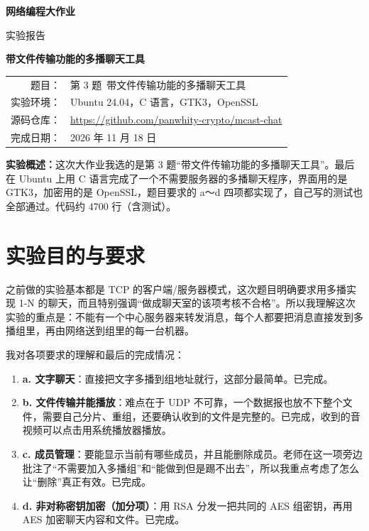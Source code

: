 \documentclass[a4paper,zihao=-4]{ctexart}
\newcommand{\reponame}{{\normalsize\url{https://github.com/panwhity-crypto/mcast-chat}}}
\begin{document}
\begin{titlepage}
  \centering
  \vspace*{3cm}
  {\sffamily\Huge\bfseries 网络编程大作业\par}
  \vspace{0.8cm}
  {\sffamily\LARGE 实验报告\par}
  \vspace{2.5cm}
  {\Large\bfseries 带文件传输功能的多播聊天工具\par}
  \vspace{3cm}
  {\large
  \begin{tabular}{r@{\quad}l}
    \toprule
    题\qquad 目： & 第 3 题\ 带文件传输功能的多播聊天工具 \\
    实验环境： & Ubuntu 24.04，C 语言，GTK3，OpenSSL \\
    源码仓库： & \reponame \\
    完成日期： & 2026 年 11 月 18 日 \\
    \bottomrule
  \end{tabular}\par}
  \vfill
\end{titlepage}

\tableofcontents
\thispagestyle{empty}
\newpage
\setcounter{page}{1}

\noindent\textbf{实验概述：}这次大作业我选的是第 3 题“带文件传输功能的多播聊天工具”。最后在 Ubuntu 上用 C 语言完成了一个不需要服务器的多播聊天程序，界面用的是 GTK3，加密用的是 OpenSSL，题目要求的 a～d 四项都实现了，自己写的测试也全部通过。代码约 4700 行（含测试）。

\section{实验目的与要求}

之前做的实验基本都是 TCP 的客户端/服务器模式，这次题目明确要求用多播实现 1-N 的聊天，而且特别强调“做成聊天室的该项考核不合格”。所以我理解这次实验的重点是：不能有一个中心服务器来转发消息，每个人都要把消息直接发到多播组里，再由网络送到组里的每一台机器。

我对各项要求的理解和最后的完成情况：

\begin{enumerate}
  \item \textbf{a. 文字聊天}：直接把文字多播到组地址就行，这部分最简单。已完成。
  \item \textbf{b. 文件传输并能播放}：难点在于 UDP 不可靠，一个数据报也放不下整个文件，需要自己分片、重组，还要确认收到的文件是完整的。已完成，收到的音视频可以点击用系统播放器播放。
  \item \textbf{c. 成员管理}：要能显示当前有哪些成员，并且能删除成员。老师在这一项旁边批注了“不需要加入多播组”和“能做到但是踢不出去”，所以我重点考虑了怎么让“删除”真正有效。已完成。
  \item \textbf{d. 非对称密钥加密（加分项）}：用 RSA 分发一把共同的 AES 组密钥，再用 AES 加密聊天内容和文件。已完成。
\end{enumerate}
\end{document}
